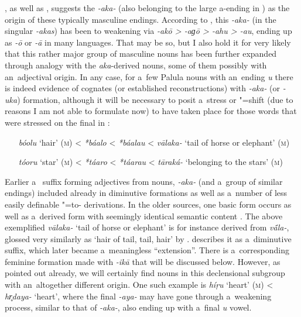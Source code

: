 \citet[15]{morgenstierne1941}, as well as \citet[29]{buddruss1967}, suggests the   \textit{-aka-} (also belonging to the large a-ending  in ) as the origin of these typically masculine endings. According to \citet[222]{masica1991}, this \textit{-aka-} (in the  singular \textit{-akas}) has been  to weakening via \textit{-akō {\textgreater} -aɡō {\textgreater} -ahu {\textgreater} -au}, ending up as \textit{-ō} or \textit{-\={a}} in many  languages. That may be so, but I also hold it for very likely that this rather major group of masculine nouns has been further expanded through analogy with the \textit{aka}-derived nouns, some of them possibly with an~adjectival origin. In any case, for a~few Palula nouns with an~ending \textit{u} there is indeed evidence of  cognates (or established reconstructions) with \textit{-aka-} (or \textit{-uka}) formation, although it will be necessary to posit a~stress or "=shift (due to reasons I am not able to formulate now) to have taken place for those words that were stressed on the final  in : 

\begin{itemize}[itemsep=0pt, leftmargin=]
\item[\textit{bóolu} `hair' (\textsc{m})] {\textless} \textit{*báalo} {\textless} \textit{*báalau} {\textless} \textit{vālaka-} `tail of horse or elephant' (\textsc{m})
\item[\textit{tóoru} `star' (\textsc{m})] {\textless} \textit{*táaro} {\textless} \textit{*táarau} {\textless} \textit{tāraká-} `belonging to the stars' (\textsc{m})
\end{itemize}

Earlier a~ suffix forming adjectives from nouns, \textit{-aka-} (and a~group of similar endings) included already in  diminutive formations as well as a~number of less easily definable "=to- derivations. In the older sources, one basic form occurs as well as a~derived form with seemingly identical semantic content \citep[1222]{whitney1960}. The above exemplified \textit{vālaka-} `tail of horse or elephant' is for instance derived from \textit{v\'{\={a}}la-}, glossed very similarly as `hair of tail, tail, hair' by \citet[12056]{turner1966}. \citet[222]{masica1991} describes it as a~diminutive suffix, which later became a~meaningless ``extension''. There is a~corresponding \citep[1181, 1222]{whitney1960} feminine formation made with \textit{-ikā} that will be discussed below. However, as pointed out already, we will certainly find nouns in this declensional subgroup with an~altogether different origin. One such example is \textit{híṛu} `heart' (\textsc{m}) {\textless} \textit{hr̥daya-} `heart', where the final \textit{-aya-} may have gone through a~weakening process, similar to that of \textit{-aka-}, also ending up with a~final \textit{u} vowel.


